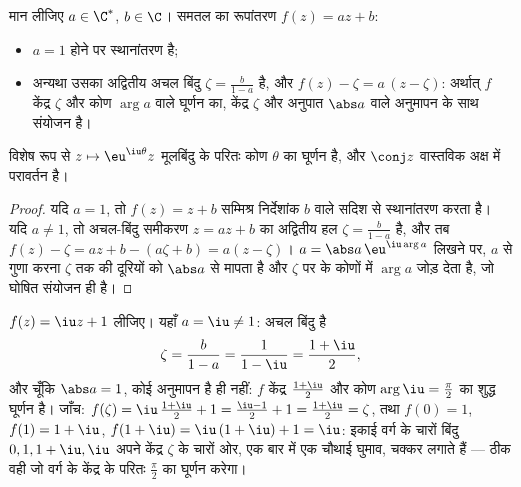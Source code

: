 \begin{proposition}[प्रतिचित्रण $z \mapsto az + b$]\label{prop:b1:complex:similitude}
मान लीजिए $a \in \C^*$, $b \in \C$। समतल का रूपांतरण $f(z) = az + b$:
\begin{itemize}
  \item $a = 1$ होने पर स्थानांतरण है;
  \item अन्यथा उसका अद्वितीय अचल बिंदु $\zeta = \frac{b}{1-a}$ है, और $f(z)
  - \zeta = a\,(z - \zeta)$: अर्थात् $f$ केंद्र $\zeta$ और कोण $\arg a$ वाले
  घूर्णन का, केंद्र $\zeta$ और अनुपात $\abs a$ वाले अनुमापन के साथ संयोजन
  है।
\end{itemize}
विशेष रूप से $z \mapsto \eu^{\iu\theta} z$ मूलबिंदु के परितः कोण $\theta$ का
घूर्णन है, और $\conj z$ वास्तविक अक्ष में परावर्तन है।
\end{proposition}

\begin{proof}
यदि $a = 1$, तो $f(z) = z + b$ सम्मिश्र निर्देशांक $b$ वाले सदिश से
स्थानांतरण करता है। यदि $a \neq 1$, तो अचल-बिंदु समीकरण $z = az + b$ का
अद्वितीय हल $\zeta = \frac{b}{1-a}$ है, और तब $f(z) - \zeta = az + b -
(a\zeta + b) = a(z - \zeta)$। $a = \abs a\, \eu^{\iu\arg a}$ लिखने पर, $a$
से गुणा करना $\zeta$ तक की दूरियों को $\abs a$ से मापता है और $\zeta$ पर के
कोणों में $\arg a$ जोड़ देता है, जो घोषित संयोजन ही है।
\end{proof}

\begin{example}\label{ex:b1:complex:classify}
$f(z) = \iu z + 1$ लीजिए। यहाँ $a = \iu \neq 1$: अचल बिंदु है
\[
\zeta = \frac{b}{1 - a} = \frac1{1 - \iu}
= \frac{1 + \iu}{2},
\]
और चूँकि $\abs a = 1$, कोई अनुमापन है ही नहीं: $f$ केंद्र $\frac{1+\iu}2$ और
कोण $\arg \iu = \frac\pi2$ का शुद्ध घूर्णन है। जाँच: $f(\zeta) =
\iu\,\frac{1+\iu}2 + 1 = \frac{\iu - 1}2 + 1 = \frac{1 + \iu}2 = \zeta$, तथा
$f(0) = 1$, $f(1) = 1 + \iu$, $f(1 + \iu) = \iu\,(1 + \iu) + 1 = \iu$: इकाई
वर्ग के चारों बिंदु $0, 1, 1+\iu, \iu$ अपने केंद्र $\zeta$ के चारों ओर, एक
बार में एक चौथाई घुमाव, चक्कर लगाते हैं --- ठीक वही जो वर्ग के केंद्र के
परितः $\frac\pi2$ का घूर्णन करेगा।
\end{example}

